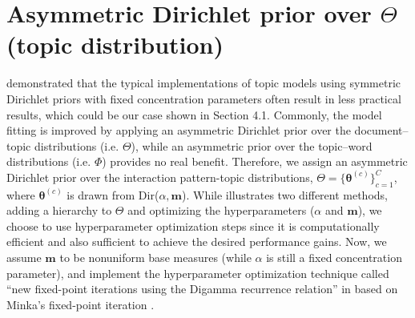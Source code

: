 \documentclass[a4paper]{article}
\begin{document}
\section{Asymmetric Dirichlet prior over $\Theta$ (topic distribution)}
\cite{wallach2009rethinking} demonstrated that the typical implementations of topic models using symmetric Dirichlet priors with fixed concentration parameters often result in less practical results, which could be our case shown in Section 4.1. Commonly, the model fitting is improved by applying an asymmetric Dirichlet prior over the document–topic distributions (i.e. $\Theta$), while an asymmetric prior over the topic–word distributions (i.e. $\Phi$) provides no real benefit. Therefore, we assign an asymmetric Dirichlet prior over the interaction pattern-topic distributions, $\Theta=\{\boldsymbol{\theta}^{(c)} \}_{c=1}^{C}$, where $\boldsymbol{\theta}^{(c)}$ is drawn from Dir($\alpha, \boldsymbol{m}$). While \cite{wallach2009rethinking} illustrates two different methods, adding a hierarchy to $\Theta$ and optimizing the hyperparameters ($\alpha$ and $\boldsymbol{m}$), we choose to use hyperparameter
optimization steps since it is computationally efficient and also sufficient to achieve the desired performance gains. Now, we assume $\boldsymbol{m}$ to be nonuniform base measures (while $\alpha$ is still a fixed concentration parameter), and implement the hyperparameter optimization technique called ``new fixed-point iterations using the Digamma recurrence relation'' in \cite{wallach2008structured} based on Minka’s fixed-point iteration \citep{minka2000estimating}.
\end{document}
